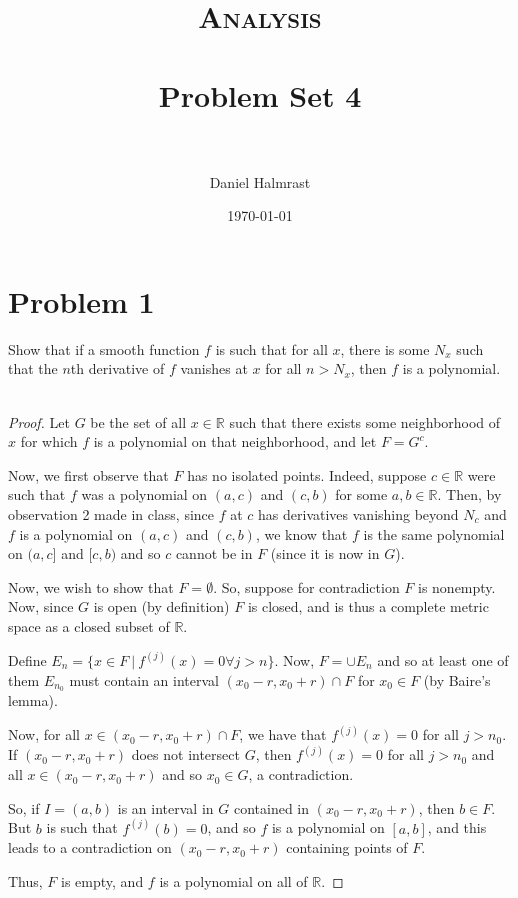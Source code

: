 \documentclass[fontsize=11pt]{scrartcl} %
\title{	
\normalfont \normalsize 
\textsc{Analysis} \\ [25pt] %
\horrule{0.5pt} \\[0.4cm] %
\huge Problem Set 4 \\ %
\horrule{2pt} \\[0.5cm] %
}
\author{Daniel Halmrast} %
\date{\normalsize\today} %
\numberwithin{equation}{section} %
\numberwithin{figure}{section} %
\numberwithin{table}{section} %
\newcommand{\R}{\mathbb{R}}
\begin{document}
\maketitle %

\section*{Problem 1}
Show that if a smooth function $f$ is such that for all $x$, there is some $N_x$
such that the $n$th derivative of $f$ vanishes at $x$ for all $n>N_x$, then $f$
is a polynomial.
\\
\\
\begin{proof}
Let $G$ be the set of all $x\in\R$ such that there exists some neighborhood of
$x$ for which $f$ is a polynomial on that neighborhood, and let $F=G^c$.

Now, we first observe that $F$ has no isolated points.
Indeed, suppose $c\in\R$ were such that $f$ was a polynomial on $(a,c)$ and
$(c,b)$ for some $a,b\in\R$. Then, by observation 2 made in class, since $f$ at
$c$ has derivatives vanishing beyond $N_c$ and $f$ is a polynomial on $(a,c)$
and $(c,b)$, we know that $f$ is the same polynomial on $(a,c]$ and $[c,b)$ and
so $c$ cannot be in $F$ (since it is now in $G$).

Now, we wish to show that $F=\emptyset$. So, suppose for contradiction $F$ is
nonempty. Now, since $G$ is open (by definition) $F$ is closed, and is thus a
complete metric space as a closed subset of $\R$.

Define $E_n = \{x\in F\ |\ f^{(j)}(x) = 0 \forall j>n\}$. Now, $F = \cup E_n$
and so at least one of them $E_{n_0}$ must contain an interval
$(x_0-r,x_0+r)\cap F$ for $x_0\in F$ (by Baire's lemma).

Now, for all $x\in (x_0-r,x_0+r)\cap F$, we have that $f^{(j)}(x) = 0$ for all
$j>n_0$. If $(x_0-r,x_0+r)$ does not intersect $G$, then $f^{(j)}(x) = 0$ for
all $j>n_0$ and all $x\in (x_0-r,x_0+r)$ and so $x_0\in G$, a contradiction.

So, if $I=(a,b)$ is an interval in $G$ contained in $(x_0-r,x_0+r)$, then $b\in
F$. But $b$ is such that $f^{(j)}(b) = 0$, and so $f$ is a polynomial on
$[a,b]$, and this leads to a contradiction on $(x_0-r,x_0+r)$ containing points
of $F$.

Thus, $F$ is empty, and $f$ is a polynomial on all of $\R$.
\end{proof}

\newpage
\end{document}
